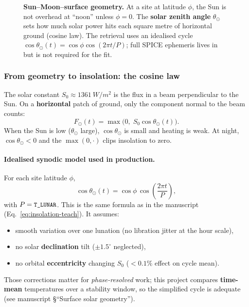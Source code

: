 \begin{figure}[htbp]
\begin{tikzpicture}
\end{tikzpicture}
\caption{\textbf{Sun--Moon--surface geometry.} At a site at latitude $\phi$, the
  Sun is not overhead at ``noon'' unless $\phi=0$. The \textbf{solar zenith angle}
  $\theta_\odot$ sets how much solar power hits each square metre of horizontal
  ground (cosine law). The retrieval uses an idealised cycle
  $\cos\theta_\odot(t)=\cos\phi\cos(2\pi t/P)$; full SPICE ephemeris lives in
   but is not required for the \Kdstar{} fit.}
\label{fig:sun-moon-geometry}
\end{figure}

\subsubsection{From geometry to insolation: the cosine law}

The solar constant $S_0 \approx \SI{1361}{W/m^2}$ is the flux in a beam
perpendicular to the Sun. On a \textbf{horizontal} patch of ground, only the
component normal to the beam counts:
\begin{equation}
  F_\odot(t) = \max\!\bigl(0,\; S_0 \cos\theta_\odot(t)\bigr).
  \label{eq:insolation-teach}
\end{equation}
When the Sun is low ($\theta_\odot$ large), $\cos\theta_\odot$ is small and
heating is weak. At night, $\cos\theta_\odot < 0$ and the $\max(0,\cdot)$ clips
insolation to zero.

\paragraph{Idealised synodic model used in production.}
For each site latitude $\phi$,
\begin{equation}
  \cos\theta_\odot(t) = \cos\phi \,\cos\!\left(\frac{2\pi t}{P}\right),
  \label{eq:cos-zenith-ideal}
\end{equation}
with $P = \texttt{\small T\_LUNAR}$. This is the same formula as in the manuscript
(Eq.~\eqref{eq:insolation-teach}). It assumes:
\begin{itemize}[leftmargin=1.4em,itemsep=1pt]
  \item smooth variation over one lunation (no libration jitter at the hour scale),
  \item no solar \textbf{declination} tilt ($\pm 1.5^\circ$ neglected),
  \item no orbital \textbf{eccentricity} changing $S_0$ ($<0.1\%$ effect on cycle mean).
\end{itemize}
Those corrections matter for \emph{phase-resolved} work; this project compares
\textbf{time-mean} temperatures over a stability window, so the simplified cycle is
adequate (see manuscript \S``Surface solar geometry'').


